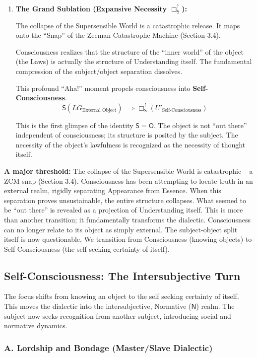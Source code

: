 \documentclass[12pt]{book}
\newcommand{\SBoxUp}{\Box_{\mathsf{S}}^{\uparrow}}
\begin{document}
\begin{enumerate}
\item \textbf{The Grand Sublation (Expansive Necessity $\SBoxUp$):}

The collapse of the Supersensible World is a catastrophic release. It maps onto the ``Snap'' of the Zeeman Catastrophe Machine (Section 3.4).

Consciousness realizes that the structure of the ``inner world'' of the object (the Laws) is actually the structure of Understanding itself. The fundamental compression of the subject/object separation dissolves.

This profound ``Aha!'' moment propels consciousness into \textbf{Self-Consciousness}.
\[
\mathsf{S}(LG_{\text{External Object}}) \implies \SBoxUp(U'_{\text{Self-Consciousness}})
\]

This is the first glimpse of the identity $\mathsf{S} = \mathsf{O}$. The object is not ``out there'' independent of consciousness; its structure is posited by the subject. The necessity of the object's lawfulness is recognized as the necessity of thought itself.
\end{enumerate}

\textbf{A major threshold:} The collapse of the Supersensible World is catastrophic -- a ZCM snap (Section 3.4). Consciousness has been attempting to locate truth in an external realm, rigidly separating Appearance from Essence. When this separation proves unsustainable, the entire structure collapses. What seemed to be ``out there'' is revealed as a projection of Understanding itself. This is more than another transition; it fundamentally transforms the dialectic. Consciousness can no longer relate to its object as simply external. The subject-object split itself is now questionable. We transition from Consciousness (knowing objects) to Self-Consciousness (the self seeking certainty of itself).

\subsection{Self-Consciousness: The Intersubjective Turn}

The focus shifts from knowing an object to the self seeking certainty of itself. This moves the dialectic into the intersubjective, Normative ($\mathsf{N}$) realm. The subject now seeks recognition from another subject, introducing social and normative dynamics.

\subsubsection{A. Lordship and Bondage (Master/Slave Dialectic)}
\end{document}
